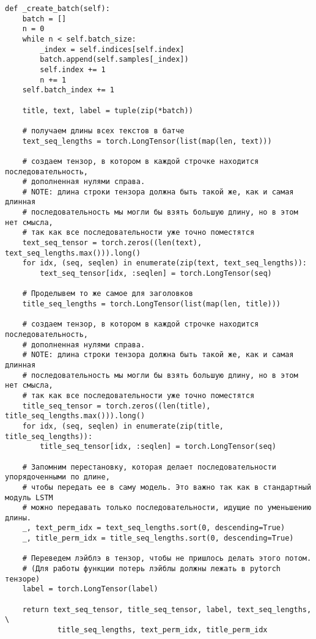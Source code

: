 \begin{verbatim}
def _create_batch(self):
    batch = []
    n = 0
    while n < self.batch_size:
        _index = self.indices[self.index]
        batch.append(self.samples[_index])
        self.index += 1
        n += 1
    self.batch_index += 1

    title, text, label = tuple(zip(*batch))

    # получаем длины всех текстов в батче
    text_seq_lengths = torch.LongTensor(list(map(len, text)))

    # создаем тензор, в котором в каждой строчке находится последовательность,
    # дополненная нулями справа.
    # NOTE: длина строки тензора должна быть такой же, как и самая длинная 
    # последовательность мы могли бы взять большую длину, но в этом нет смысла, 
    # так как все последовательности уже точно поместятся
    text_seq_tensor = torch.zeros((len(text), text_seq_lengths.max())).long()
    for idx, (seq, seqlen) in enumerate(zip(text, text_seq_lengths)):
        text_seq_tensor[idx, :seqlen] = torch.LongTensor(seq)
        
    # Проделывем то же самое для заголовков
    title_seq_lengths = torch.LongTensor(list(map(len, title)))
    
    # создаем тензор, в котором в каждой строчке находится последовательность,
    # дополненная нулями справа.
    # NOTE: длина строки тензора должна быть такой же, как и самая длинная 
    # последовательность мы могли бы взять большую длину, но в этом нет смысла, 
    # так как все последовательности уже точно поместятся
    title_seq_tensor = torch.zeros((len(title), title_seq_lengths.max())).long()
    for idx, (seq, seqlen) in enumerate(zip(title, title_seq_lengths)):
        title_seq_tensor[idx, :seqlen] = torch.LongTensor(seq)

    # Запомним перестановку, которая делает последовательности упорядоченными по длине, 
    # чтобы передать ее в саму модель. Это важно так как в стандартный модуль LSTM 
    # можно передавать только последовательности, идущие по уменьшению длины.
    _, text_perm_idx = text_seq_lengths.sort(0, descending=True)
    _, title_perm_idx = title_seq_lengths.sort(0, descending=True)

    # Переведем лэйблэ в тензор, чтобы не пришлось делать этого потом. 
    # (Для работы функции потерь лэйблы должны лежать в pytorch тензоре)
    label = torch.LongTensor(label)

    return text_seq_tensor, title_seq_tensor, label, text_seq_lengths, \ 
            title_seq_lengths, text_perm_idx, title_perm_idx


\end{verbatim}
